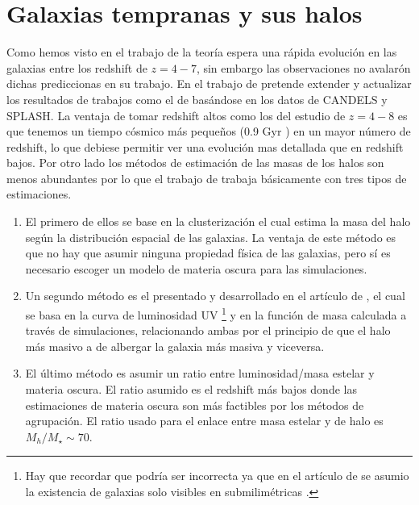 \documentclass{article}
\begin{document}
\section*{Galaxias tempranas y sus halos}
Como hemos visto en el trabajo de \cite{finkelstein2015increasing} la teoría espera una rápida evolución en las galaxias entre los redshift de $z=4-7$, sin embargo las observaciones no avalarón dichas prediccionas en su trabajo. En el trabajo de \cite{steinhardt2016impossibly} pretende extender y actualizar los resultados de trabajos como el de \cite{finkelstein2015increasing} basándose en los datos de CANDELS y SPLASH. La ventaja de tomar redshift altos como los del estudio de $z=4-8$ es que tenemos un tiempo cósmico más pequeños (0.9 Gyr \citep{steinhardt2016impossibly}) en un mayor número de redshift, lo que debiese permitir ver una evolución mas detallada que en redshift bajos. Por otro lado los métodos de estimación de las masas de los halos son menos abundantes por lo que el trabajo de \cite{steinhardt2016impossibly} trabaja básicamente con tres tipos de estimaciones.
\begin{enumerate}
\item El primero de ellos se base en la clusterización \citep{hildebrandt2009cars} el cual estima la masa del halo según la distribución espacial de las galaxias. La ventaja de este método es que no hay que asumir ninguna propiedad física de las galaxias, pero sí es necesario escoger un modelo de materia oscura para las simulaciones.
\item Un segundo método es el presentado y desarrollado en el artículo de \cite{finkelstein2015increasing}, el cual se basa en la curva de luminosidad UV \footnote{Hay que recordar que podría ser incorrecta ya que en el artículo de se asumio la existencia de galaxias solo visibles en submilimétricas \citep{wang2019dominant}.} y en la función de masa calculada a través de simulaciones, relacionando ambas por el principio de que el halo más masivo a de albergar la galaxia más masiva y viceversa.
\item El último método es asumir un ratio entre luminosidad/masa estelar y materia oscura. El ratio asumido es el redshift más bajos donde las estimaciones de materia oscura son más factibles por los métodos de agrupación. El ratio usado para el enlace entre masa estelar y de halo es  $M_h/M_\star \sim 70 $.
\end{enumerate}
\end{document}
